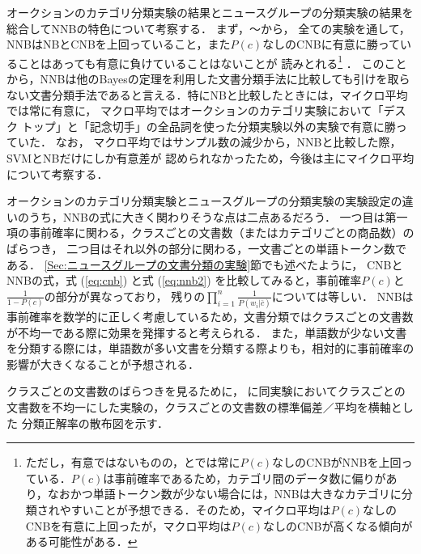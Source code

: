 \documentclass[japanese]{jnlp_1.4}
\newcommand{\figref}[1]{}
\newcommand{\tabref}[1]{}
\begin{document}
オークションのカテゴリ分類実験の結果とニュースグループの分類実験の結果を総合してNNBの特色について考察する．
まず，\tabref{Tab:全ての品詞を使用したオークションのカテゴリ分類実験の分類正解率}〜\tabref{Tab:クラスごとの文書数を不均一にした実験の分類正解率（マクロ）}から，
全ての実験を通して，NNBはNBとCNBを上回っていること，また$P(c)$なしのCNBに有意に勝っていることはあっても有意に負けていることはないことが
読みとれる\footnote{ただし，有意ではないものの，\tabref{Tab:全ての品詞を使用したオークションのカテゴリ分類実験の分類正解率（マクロ）}と\tabref{Tab:名詞だけを使用したオークションのカテゴリ分類実験の分類正解率（マクロ）}では常に$P(c)$なしのCNBがNNBを上回っている．$P(c)$は事前確率であるため，カテゴリ間のデータ数に偏りがあり，なおかつ単語トークン数が少ない場合には，NNBは大きなカテゴリに分類されやすいことが予想できる．そのため，マイクロ平均は$P(c)$なしのCNBを有意に上回ったが，マクロ平均は$P(c)$なしのCNBが高くなる傾向がある可能性がある．}
．
このことから，NNBは他のBayesの定理を利用した文書分類手法に比較しても引けを取らない文書分類手法であると言える．特にNBと比較したときには，マイクロ平均では常に有意に，
マクロ平均ではオークションのカテゴリ実験において「デスク
トップ」と「記念切手」の全品詞を使った分類実験以外の実験で有意に勝っていた．
なお，
マクロ平均ではサンプル数の減少から，NNBと比較した際，SVMとNBだけにしか有意差が
認められなかったため，今後は主にマイクロ平均について考察する．

オークションのカテゴリ分類実験とニュースグループの分類実験の実験設定の違いのうち，NNBの式に大きく関わりそうな点は二点あるだろう．
一つ目は第一項の事前確率に関わる，クラスごとの文書数（またはカテゴリごとの商品数）のばらつき，
二つ目はそれ以外の部分に関わる，一文書ごとの単語トークン数である．
\ref{Sec:ニュースグループの文書分類の実験}節でも述べたように，
CNBとNNBの式，式 (\ref{eq:cnb}) と式 (\ref{eq:nnb2}) を比較してみると，事前確率$P(c)$と$ \frac{1}{1-P(c)}$の部分が異なっており，
残りの$\prod_{i=1}^{n} \frac{1}{P(w_i|\bar{c})}$については等しい．
NNBは事前確率を数学的に正しく考慮しているため，文書分類ではクラスごとの文書数が不均一である際に効果を発揮すると考えられる．
また，単語数が少ない文書を分類する際には，単語数が多い文書を分類する際よりも，相対的に事前確率の影響が大きくなることが予想される．


クラスごとの文書数のばらつきを見るために，
\figref{Fig:標準偏差／平均}に同実験においてクラスごとの文書数を不均一にした実験の，クラスごとの文書数の標準偏差／平均を横軸とした
分類正解率の散布図を示す．
\end{document}
